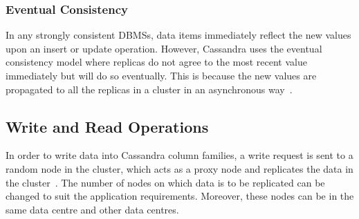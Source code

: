 \subsubsection{Eventual Consistency}
In any strongly consistent  \acp{DBMS}, data items immediately reflect the new
values upon an insert or update operation. However, Cassandra uses the eventual
consistency model where replicas do not agree to the most recent value
immediately but will do so eventually. This is because the new values are
propagated to all the replicas in a cluster in an asynchronous
way~\citep{Tai,ycsb,henry,Vogel}.

 
\subsection{Write and Read Operations}
\label{ss:Background-Cassandra-Operations} 
In order to write data into Cassandra column families,  a write request is sent
to a random node in the cluster,  which acts as a proxy node and replicates the
data in the cluster~\citep{datastax,BOOK,cassandra}.
The number of nodes on which data is to be replicated can be changed to suit the
application requirements. Moreover, these nodes can be in the same data centre
and other data centres.


